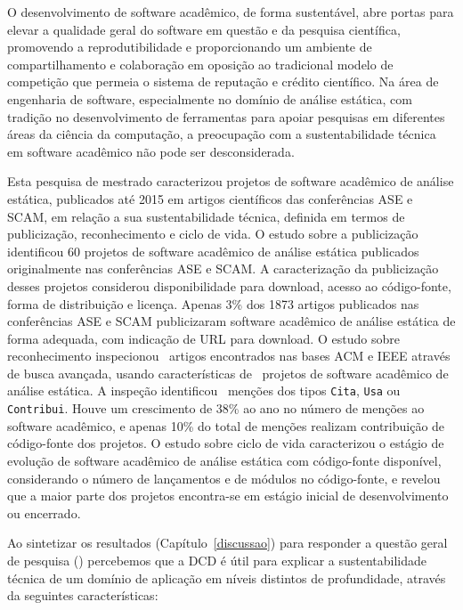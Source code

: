 \label{conclusoes}

O desenvolvimento de software acadêmico, de forma sustentável,
abre portas para elevar a qualidade geral do software em questão e
da pesquisa científica, promovendo a reprodutibilidade e
proporcionando um ambiente de compartilhamento e colaboração 
em oposição ao tradicional modelo de competição que permeia
o sistema de reputação e crédito científico.
%
Na área de engenharia de software, 
especialmente no domínio de análise estática,
com tradição no desenvolvimento de ferramentas para apoiar pesquisas
em diferentes áreas da ciência da computação,
a preocupação com a sustentabilidade técnica em software acadêmico
não pode ser desconsiderada. 

Esta pesquisa de mestrado caracterizou
projetos de software acadêmico de análise estática,
publicados até 2015 em artigos científicos das conferências ASE e SCAM,
em relação a sua sustentabilidade técnica, definida
em termos de publicização, reconhecimento e ciclo de vida.
%
O estudo sobre a publicização
identificou 60 projetos de software acadêmico de análise estática
publicados originalmente nas conferências ASE e SCAM.
A caracterização da publicização desses projetos considerou
disponibilidade para download, acesso ao código-fonte, forma de distribuição e licença.
Apenas 3\% dos 1873 artigos publicados nas conferências ASE e SCAM 
publicizaram software acadêmico de análise estática de forma adequada,
com indicação de URL para download.
%
O estudo sobre reconhecimento 
inspecionou \SearchUniqueCount \ artigos encontrados nas bases ACM
e IEEE através de busca avançada, 
usando características de \SoftwareCount \ projetos 
de software acadêmico de análise estática. 
A inspeção identificou  \ScreeningCount \ menções 
dos tipos \texttt{Cita}, \texttt{Usa} ou \texttt{Contribui}.
Houve um crescimento de 38\% ao ano no número de menções ao software acadêmico, 
e apenas 10\% do total de menções realizam contribuição de código-fonte dos
projetos.
%
O estudo sobre ciclo de vida
caracterizou o estágio de evolução de software acadêmico de análise estática
com código-fonte disponível,
considerando o número de lançamentos e de módulos no código-fonte,
e revelou que a maior parte dos projetos encontra-se 
em estágio inicial de desenvolvimento ou encerrado.

Ao sintetizar os resultados (Capítulo~\ref{discussao}) para responder a questão
geral de pesquisa ({\it \QuestaoGeralUm}) percebemos que a DCD é útil para
explicar a sustentabilidade técnica de um domínio de aplicação em níveis
distintos de profundidade, através da seguintes características:

